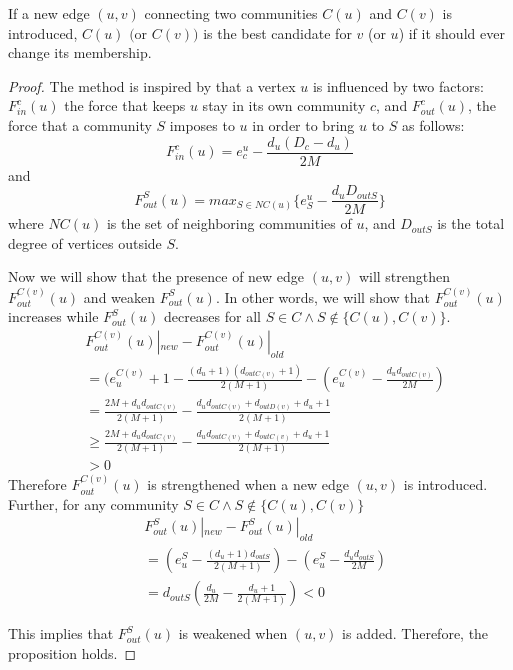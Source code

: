 \begin{prop}\label{3}
If a new edge $(u,v)$ connecting two communities $C(u)$ and $C(v)$ is introduced, $C(u)$ $($or $C(v))$ is the best candidate for $v$ (or $u$) if it should ever change its membership.
\end{prop}


\begin{proof}
The method is inspired by \cite{PhysRevE.78.046115} that a vertex $u$ is influenced by two factors: $F^c_{in}(u)$ the force that keeps $u$ stay in its own community $c$, and $F^c_{out}(u)$, the force that a community $S$ imposes to $u$ in order to bring $u$ to $S$ as follows:
\[
F^c_{in}(u)=e_c^u-\frac{d_u(D_c-d_u)}{2M}
\]
and 
\[
F^S_{out}(u)=max_{S\in NC(u)} \{e_S^u - \frac{d_u D_{outS}}{2M}\}
\]
where $NC(u)$ is the set of neighboring communities of $u$, and $D_{outS}$ is the total degree of vertices outside $S$.

Now we will show that the presence of new edge $(u,v)$ will strengthen $F^{C(v)}_{out}(u)$ and weaken $F^S_{out}(u)$. In other words, we will show that $F^{C(v)}_{out}(u)$ increases while $F^S_{out}(u)$ decreases for all $S \in C \wedge S \notin \{C(u),C(v)\}$.
\[
\begin{split}
&F^{C(v)}_{out}(u)|_{new} - F^{C(v)}_{out}(u)|_{old}\\
&=(e_u^{C(v)}+1-\frac{(d_u+1)(d_{outC(v)}+1)}{2(M+1)} - (e_u^{C(v)} - \frac{d_ud_{outC(v)}}{2M})\\
&= \frac{2M+d_ud_{outC(v)}}{2(M+1)} - \frac{d_ud_{outC(v)}+d_{outD(v)}+d_u+1}{2(M+1)}\\
&\geq \frac{2M+d_ud_{outC(v)}}{2(M+1)} - \frac{d_u d_{outC(v)}+d_{outC(v)}+d_u+1}{2(M+1)}\\
&>0
\end{split}
\]
Therefore $F^{C(v)}_{out}(u)$ is strengthened when a new edge $(u,v)$ is introduced. Further, for any community $S\in C \wedge S\notin \{C(u),C(v)\}$
\[
\begin{split}
& F^{S}_{out}(u)|_{new} - F^{S}_{out}(u)|_{old}\\
&= (e^S_u-\frac{(d_u+1)d_{outS}}{2(M+1)}) - (e^S_u - \frac{d_ud_{outS}}{2M})\\
&= d_{outS}(\frac{d_u}{2M} - \frac{d_u+1}{2(M+1)})<0
\end{split}
\]

This implies that $F^S_{out}(u)$ is weakened when $(u,v)$ is added. Therefore,  the proposition holds.
\end{proof}




